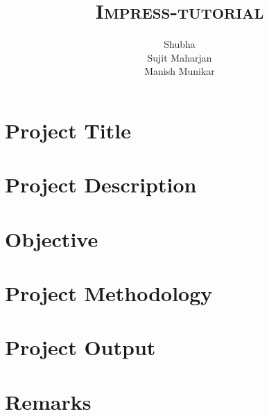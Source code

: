 \documentclass[12pt,a4paper]{article}
\title{
  {\Huge{\textsc{Impress-tutorial}}}
}
\author{Shubha \\ Sujit Maharjan \\ Manish Munikar}
\begin{document}
\maketitle
\section{Project Title}
\section{Project Description}
\section{Objective}
\section{Project Methodology}
\section{Project Output}
\section{Remarks}
\end{document}

